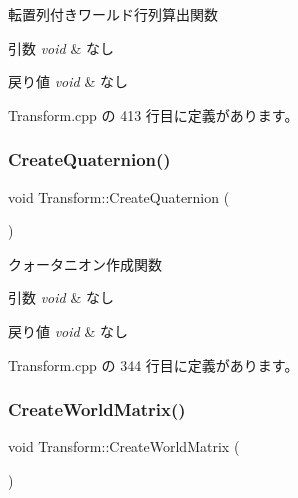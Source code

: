 転置列付きワールド行列算出関数 


\begin{DoxyParams}{引数}
{\em void} & なし \\
\hline
\end{DoxyParams}

\begin{DoxyRetVals}{戻り値}
{\em void} & なし \\
\hline
\end{DoxyRetVals}


 Transform.\+cpp の 413 行目に定義があります。

\mbox{\label{class_transform_a7884cb828ace5c921e7138d83c43d689}} 
\subsubsection{\texorpdfstring{Create\+Quaternion()}{CreateQuaternion()}}
{\footnotesize\ttfamily void Transform\+::\+Create\+Quaternion (\begin{DoxyParamCaption}{ }\end{DoxyParamCaption})\hspace{0.3cm}{\ttfamily [private]}}



クォータニオン作成関数 


\begin{DoxyParams}{引数}
{\em void} & なし \\
\hline
\end{DoxyParams}

\begin{DoxyRetVals}{戻り値}
{\em void} & なし \\
\hline
\end{DoxyRetVals}


 Transform.\+cpp の 344 行目に定義があります。

\mbox{\label{class_transform_a81a4882eb3c4d7afb243b9911c666b52}} 
\subsubsection{\texorpdfstring{Create\+World\+Matrix()}{CreateWorldMatrix()}}
{\footnotesize\ttfamily void Transform\+::\+Create\+World\+Matrix (\begin{DoxyParamCaption}{ }\end{DoxyParamCaption})}



